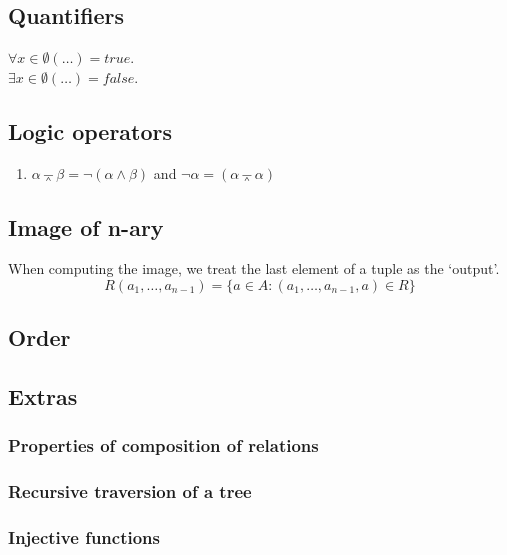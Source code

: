 \documentclass[twocolumn,a4paper]{article}
\newcommand{\image}[1]{
\begin{figure}[ht]
	\centering
	\fbox{\resizebox{0.85\columnwidth}{!}{\texttt{[image: \#1]}}}
\end{figure}
}
\begin{document}
\subsection*{Quantifiers}

\(\forall x\in\emptyset(\ldots) = true\). \\
\(\exists x\in\emptyset(\ldots) = false\).

\subsection*{Logic operators}
\begin{enumerate}
	\item $\alpha \barwedge \beta = \neg (\alpha \wedge \beta)$ and $\neg \alpha = (\alpha \barwedge \alpha)$
\end{enumerate}

\subsection*{Image of n-ary}
When computing the image, we treat the last element of a tuple as the `output'.
\begin{equation}
	R(a_1, \ldots, a_{n-1}) = \{a \in A : (a_1, \ldots, a_{n-1}, a) \in R \}
\end{equation}
\newpage
\subsection*{Order}
\image{misc/order-piazza.png}



\subsection*{Extras}

\subsubsection*{Properties of composition of relations}
\image{2017_1/2017a/uppg3.png}

\newpage
\subsubsection*{Recursive traversion of a tree}
\image{2017_1/2017a/uppg5.png}

\newpage
\subsubsection*{Injective functions}
\image{2017_1/2017a/uppg4.png}
\end{document}
